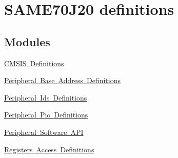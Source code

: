 \hypertarget{group__SAME70J20__definitions}{}\section{S\+A\+M\+E70\+J20 definitions}
\label{group__SAME70J20__definitions}
\subsection*{Modules}
\begin{DoxyCompactItemize}
\item 
\mbox{\hyperlink{group__SAME70J20__cmsis}{C\+M\+S\+I\+S Definitions}}
\item 
\mbox{\hyperlink{group__SAME70J20__base}{Peripheral Base Address Definitions}}
\item 
\mbox{\hyperlink{group__SAME70J20__id}{Peripheral Ids Definitions}}
\item 
\mbox{\hyperlink{group__SAME70J20__pio}{Peripheral Pio Definitions}}
\item 
\mbox{\hyperlink{group__SAME70J20__api}{Peripheral Software A\+PI}}
\item 
\mbox{\hyperlink{group__SAME70J20__reg}{Registers Access Definitions}}
\end{DoxyCompactItemize}
